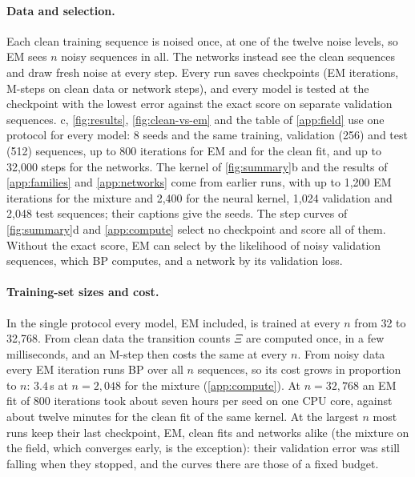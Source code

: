 \documentclass{article}
\begin{document}
\paragraph{Data and selection.} Each clean training sequence is noised once, at one of the twelve noise levels, so EM
sees $n$ noisy sequences in all. The networks instead see the clean sequences and draw fresh noise at every step. Every
run saves checkpoints (EM iterations, M-steps on clean data or network steps), and every model is tested at the
checkpoint with the lowest error against the exact score on separate validation sequences. c,
\cref{fig:results}, \cref{fig:clean-vs-em} and the table of \cref{app:field} use one protocol for every model: 8 seeds
and the same training, validation (256) and test (512) sequences, up to 800 iterations for EM and for the clean fit,
and up to 32{,}000 steps for the networks. The kernel of \cref{fig:summary}b and the results of \cref{app:families} and
\cref{app:networks} come from earlier runs, with up to 1{,}200 EM iterations for the mixture and 2{,}400 for the neural
kernel, 1{,}024 validation and 2{,}048 test sequences; their captions give the seeds. The step curves of
\cref{fig:summary}d and \cref{app:compute} select no checkpoint and score all of them. Without the exact score, EM can select by the likelihood
of noisy validation sequences, which BP computes, and a network by its validation loss.

\paragraph{Training-set sizes and cost.} In the single protocol every model, EM included, is trained at every $n$ from
32 to 32{,}768. From clean data the transition counts $\Xi$ are computed once, in a few milliseconds, and an M-step then
costs the same at every $n$. From noisy data every EM iteration runs BP over all $n$ sequences, so its cost grows in
proportion to $n$: $3.4$\,s at $n=2{,}048$ for the mixture (\cref{app:compute}). At $n=32{,}768$ an EM fit of 800
iterations took about seven hours per seed on one CPU core, against about twelve minutes for the clean fit of the same
kernel. At the largest $n$ most runs keep their last checkpoint, EM, clean fits and networks alike (the mixture on the
field, which converges early, is the exception): their validation error was still falling when they stopped, and the
curves there are those of a fixed budget.
\end{document}
